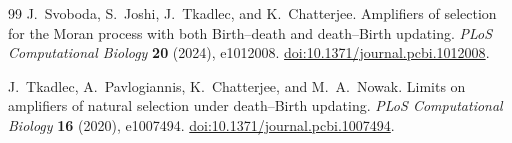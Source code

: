 \begin{thebibliography}{99}
J.~Svoboda, S.~Joshi, J.~Tkadlec, and K.~Chatterjee.
Amplifiers of selection for the Moran process with both Birth--death and
death--Birth updating.
\emph{PLoS Computational Biology} \textbf{20} (2024), e1012008.
\href{https://doi.org/10.1371/journal.pcbi.1012008}
{doi:10.1371/journal.pcbi.1012008}.

J.~Tkadlec, A.~Pavlogiannis, K.~Chatterjee, and M.~A.~Nowak.
Limits on amplifiers of natural selection under death--Birth updating.
\emph{PLoS Computational Biology} \textbf{16} (2020), e1007494.
\href{https://doi.org/10.1371/journal.pcbi.1007494}{doi:10.1371/journal.pcbi.1007494}.

\end{thebibliography}
